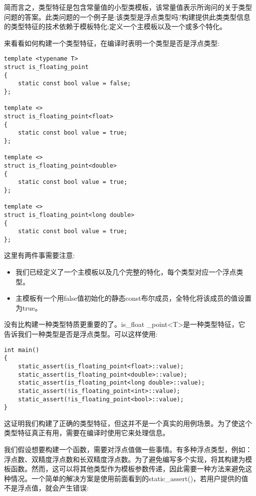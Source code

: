 简而言之，类型特征是包含常量值的小型类模板，该常量值表示所询问的关于类型问题的答案。此类问题的一个例子是:该类型是浮点类型吗?构建提供此类类型信息的类型特征的技术依赖于模板特化:定义一个主模板以及一个或多个特化。

来看看如何构建一个类型特征，在编译时表明一个类型是否是浮点类型:

\begin{lstlisting}[style=styleCXX]
template <typename T>
struct is_floating_point
{
	static const bool value = false;
};

template <>
struct is_floating_point<float>
{
	static const bool value = true;
};

template <>
struct is_floating_point<double>
{
	static const bool value = true;
};

template <>
struct is_floating_point<long double>
{
	static const bool value = true;
};
\end{lstlisting}

这里有两件事需要注意:

\begin{itemize}
\item
我们已经定义了一个主模板以及几个完整的特化，每个类型对应一个浮点类型。

\item
主模板有一个用false值初始化的静态const布尔成员，全特化将该成员的值设置为true。
\end{itemize}

没有比构建一种类型特质更重要的了。is\_float \_point<T>是一种类型特征，它告诉我们一种类型是否是浮点类型。可以这样使用:

\begin{lstlisting}[style=styleCXX]
int main()
{
	static_assert(is_floating_point<float>::value);
	static_assert(is_floating_point<double>::value);
	static_assert(is_floating_point<long double>::value);
	static_assert(!is_floating_point<int>::value);
	static_assert(!is_floating_point<bool>::value);
}
\end{lstlisting}

这证明我们构建了正确的类型特征，但这并不是一个真实的用例场景。为了使这个类型特征真正有用，需要在编译时使用它来处理信息。

我们假设想要构建一个函数，需要对浮点值做一些事情。有多种浮点类型，例如：浮点数、双精度浮点数和长双精度浮点数。为了避免编写多个实现，将其构建为模板函数。然而，这可以将其他类型作为模板参数传递，因此需要一种方法来避免这种情况。一个简单的解决方案是使用前面看到的static\_assert()，若用户提供的值不是浮点值，就会产生错误:

